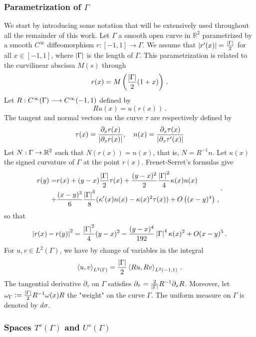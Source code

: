 \documentclass[a4paper]{article}
\begin{document}
\subsubsection*{Parametrization of $\Gamma$}
	We start by introducing some notation that will be extensively used throughout all the remainder of this work. Let $\Gamma$ a smooth open curve in $\mathbb{R}^2$ parametrized by a smooth $C^\infty$ diffeomorphism $r : [-1,1] \to \Gamma$. We assume that $\left\lvert r'(x) \right\rvert = \frac{\left\lvert \Gamma \right\rvert}{2}$ for all $x\in [-1,1]$, where $\left\lvert \Gamma \right\rvert$ is the length of $\Gamma$. This parametrization is related to the curvilinear abscissa $M(s)$ through
\[r(x) = M\left( \frac{\left\lvert \Gamma \right\rvert}{2}(1+x)\right)\,.\]
Let $R : C^{\infty}(\Gamma) \longrightarrow C^{\infty}(-1,1)$ defined by 
\[Ru(x) = u(r(x))\,.\]
The tangent and normal vectors on the curve $\tau$ are respectively defined by 
\[\tau(x) = \frac{\partial_x r(x)}{\left\lvert \partial_x r(x) \right\rvert}, \quad n(x) = \frac{\partial_x \tau(x)}{\left\lvert \partial_x \tau'(x) \right\rvert}\]
Let $N : \Gamma \to \mathbb{R}^2$ such that $N(r(x)) = n(x)$, that is, $N = R^{-1} n$. Let $\kappa(x)$ the signed curvature of $\Gamma$ at the point $r(x)$. Frenet-Serret's formulas give
\[\begin{split}r(y) = & r(x) + (y-x) \frac{\left\lvert \Gamma \right\rvert}{2} \tau(x) + \frac{(y-x)^2}{2} \frac{\left\lvert \Gamma \right\rvert^2}{4} \kappa(x) n(x)\\ 
+ &\frac{(x-y)^3}{6} \frac{\left\lvert \Gamma \right\rvert^3}{8} (\kappa'(x) n(x) - \kappa(x)^2 \tau(x)) + O\left((x-y)^4\right)\,,
\end{split}\,.\]
so that
\begin{equation}
\left\lvert r(x) - r(y) \right\rvert^2 = \frac{\left\lvert \Gamma \right\rvert^2}{4}(y-x)^2 - \frac{(y-x)^4}{192}\left\lvert \Gamma \right\rvert^4 \kappa(x)^2 + O(x-y)^5\,. 
\label{expansion_r}
\end{equation}
For $u,v \in L^2(\Gamma)$, we have by change of variables in the integral
\[\left\langle u,v\right\rangle_{L^2(\Gamma)} = \frac{\left\lvert \Gamma \right\rvert}{2}\left\langle Ru,Rv\right\rangle_{L^2(-1,1)} \,.\]
The tangential derivative $\partial_\tau$ on $\Gamma$ satisfies $\partial_\tau = \frac{2}{\left\lvert \Gamma \right\rvert}R^{-1}\partial_x R$. Moreover, let $\omega_\Gamma \mathrel{\mathop:}= \frac{\left\lvert \Gamma \right\rvert}{2} R^{-1}  \omega(x) R$ the "weight" on the curve $\Gamma$. The uniform measure on $\Gamma$ is denoted by $d\sigma$.

\subsubsection*{Spaces $T^s(\Gamma)$ and $U^s(\Gamma)$}
\end{document}
